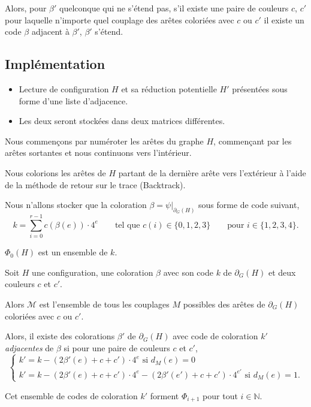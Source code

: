 \documentclass{beamer}
\begin{document}
\begin{frame}
Alors,
pour $\beta'$ quelconque qui ne s'étend pas,
s'il existe une paire de couleurs $c$, $c'$ pour laquelle n'importe quel couplage des arêtes coloriées avec $c$ ou $c'$ il existe un code $\beta$ adjacent à $\beta'$, $\beta'$ s'étend.
\end{frame}

\subsection{Implémentation}

\begin{frame}
\begin{itemize}
\item Lecture de configuration $H$ et sa réduction potentielle $H'$ présentées sous forme d'une liste d'adjacence.
\item Les deux seront stockées dans deux matrices différentes.
\end{itemize}
\end{frame}

\begin{frame}

Nous commençons par numéroter les arêtes du graphe $H$, commençant par les arêtes sortantes et nous continuons vers l'intérieur.

Nous colorions les arêtes de $H$ partant de la dernière arête vers l'extérieur à l'aide de la méthode de retour sur le trace (Backtrack).

Nous n'allons stocker que la coloration $\beta=\psi|_{\partial_G(H)}$ sous forme de code suivant,
$$
k = \sum_{i=0}^{r-1} c(\beta(e)) \cdot 4^{e} \qquad \textrm{tel que   } c(i) \in \{ 0,1,2,3 \} \qquad \textrm{pour  } i \in \{1,2,3,4 \}.
$$

$\Phi_0(H)$ est un ensemble de $k$.
\end{frame}

\begin{frame}

Soit $H$ une configuration, une coloration $\beta$ avec son code $k$ de $\partial_G(H)$ et deux couleurs $c$ et $c'$. 

Alors $\mathcal{M}$ est l'ensemble de tous les couplages $M$ possibles des arêtes de $\partial_G(H)$ coloriées avec $c$ ou $c'$.

\pause

Alors, il existe des colorations $\beta'$ de $\partial_G(H)$ avec code de coloration $k'$ \emph{adjacentes} de $\beta$ si pour une paire de couleurs $c$ et $c'$,
$$
\begin{cases}
k' =  k - (2\beta'(e)+c + c')\cdot 4^{e} \textrm{ si  }d_M(e)=0 \\
k' = k  - (2\beta'(e)+c + c')\cdot 4^{e} - (2\beta'(e')+c + c')\cdot 4^{e'} \textrm{ si  }d_M(e)=1.
\end{cases}
$$

Cet ensemble de codes de coloration $k'$ forment $\Phi_{i+1}$ pour tout $i\in \mathbb{N}$.
\end{frame}
\end{document}
